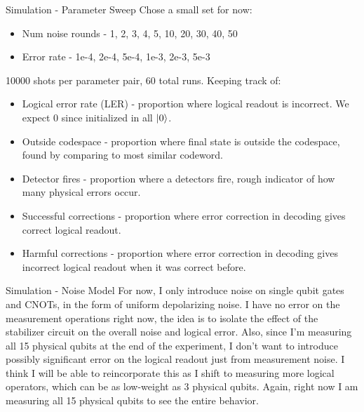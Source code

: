 \documentclass{beamer}
\begin{document}
\begin{frame}{Simulation - Parameter Sweep}
    Chose a small set for now:
    \begin{itemize}
        \item Num noise rounds - 1, 2, 3, 4, 5, 10, 20, 30, 40, 50
        \item Error rate - 1e-4, 2e-4, 5e-4, 1e-3, 2e-3, 5e-3
    \end{itemize}
    10000 shots per parameter pair, 60 total runs. Keeping track of:
    \begin{itemize}
        \item Logical error rate (LER) - proportion where logical readout is incorrect. We expect 0 since initialized in all $\ket{0}$.
        \item Outside codespace - proportion where final state is outside the codespace, found by comparing to most similar codeword.
        \item Detector fires - proportion where a detectors fire, rough indicator of how many physical errors occur.
        \item Successful corrections - proportion where error correction in decoding gives correct logical readout.
        \item Harmful corrections - proportion where error correction in decoding gives incorrect logical readout when it was correct before.
    \end{itemize}
\end{frame}

\begin{frame}{Simulation - Noise Model}
    For now, I only introduce noise on single qubit gates and CNOTs, in the form of uniform depolarizing noise. I have no error on the measurement operations right now, the idea is to isolate the effect of the stabilizer circuit on the overall noise and logical error. Also, since I'm measuring all 15 physical qubits at the end of the experiment, I don't want to introduce possibly significant error on the logical readout just from measurement noise. I think I will be able to reincorporate this as I shift to measuring more logical operators, which can be as low-weight as 3 physical qubits. Again, right now I am measuring all 15 physical qubits to see the entire behavior.
\end{frame}
\end{document}
